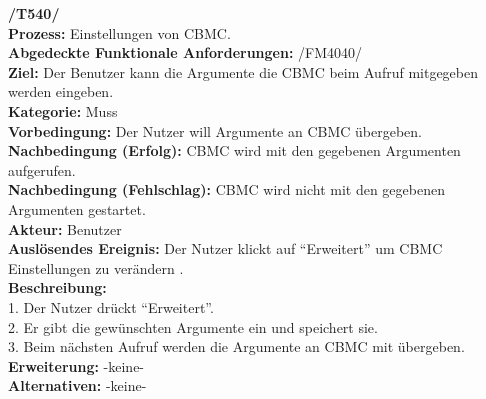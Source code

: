 \documentclass[a4paper]{scrreprt}
\begin{document}
\textbf{/T540/}\\
\textbf{Prozess:} Einstellungen von CBMC.\\
\textbf{Abgedeckte Funktionale Anforderungen:} /FM4040/ \\
\textbf{Ziel:} Der Benutzer kann die Argumente die CBMC beim Aufruf
mitgegeben werden eingeben.\\
\textbf{Kategorie:} Muss\\
\textbf{Vorbedingung:} Der Nutzer will Argumente an CBMC übergeben.\\
\textbf{Nachbedingung (Erfolg):} CBMC wird mit den gegebenen Argumenten
aufgerufen.\\
\textbf{Nachbedingung (Fehlschlag):} CBMC wird nicht mit den gegebenen
Argumenten gestartet.\\
\textbf{Akteur:} Benutzer\\
\textbf{Auslösendes Ereignis:} Der Nutzer klickt auf "`Erweitert"' um CBMC Einstellungen zu verändern .\\
\textbf{Beschreibung:} \\
1. Der Nutzer drückt "`Erweitert"'.\\
2. Er gibt die gewünschten Argumente ein und speichert sie.\\
3. Beim nächsten Aufruf werden die Argumente an CBMC mit übergeben.\\
\textbf {Erweiterung:}  -keine- \\
\textbf {Alternativen:} -keine- \\ \\
\end{document}
